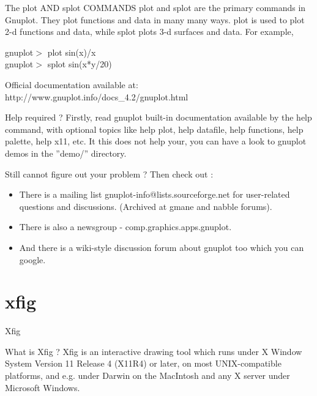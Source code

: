 \documentclass[pdf]{beamer}
\begin{document}
\begin{frame}	
	\begin{block}{The plot AND splot COMMANDS}
	plot and splot are the primary commands in Gnuplot. They plot functions and data in many many ways. plot is used to plot 2-d functions and data, while splot plots 3-d surfaces and data. For example,
	\begin{example}
	gnuplot$>$  plot sin(x)/x  \\
    gnuplot$>$  splot sin(x*y/20)
	\end{example}
	\end{block}
	
\begin{block}{}
Official documentation available at: \\
http://www.gnuplot.info/docs\_4.2/gnuplot.html
\end{block}
\end{frame}

\begin{frame}
\begin{block}{Help required ?}
Firstly, read gnuplot built-in documentation available by the help command, with optional
topics like help plot, help datafile, help functions, help palette, help x11, etc. It this does not help your, you can have a look to gnuplot demos in the ”demo/” directory.
\end{block}
\end{frame}

\begin{frame}
\begin{block}{Still cannot figure out your problem ?}
Then check out :
\begin{itemize}
\item There is a mailing list gnuplot-info@lists.sourceforge.net for user-related questions and discussions. (Archived at gmane and nabble forums).
\item There is also a newsgroup - comp.graphics.apps.gnuplot.
\item And there is a wiki-style discussion forum about gnuplot too which you can google.
\end{itemize}
\end{block}
\end{frame}

\section{xfig}

\begin{frame}{Xfig}
	\begin{block}{What is Xfig ?}
	Xfig is an interactive drawing tool which runs under X Window System Version 11 Release 4 (X11R4) or later, on most UNIX-compatible platforms, and e.g. under Darwin on the MacIntosh and any X server under Microsoft Windows.
	\end{block}
\end{frame}
\end{document}
